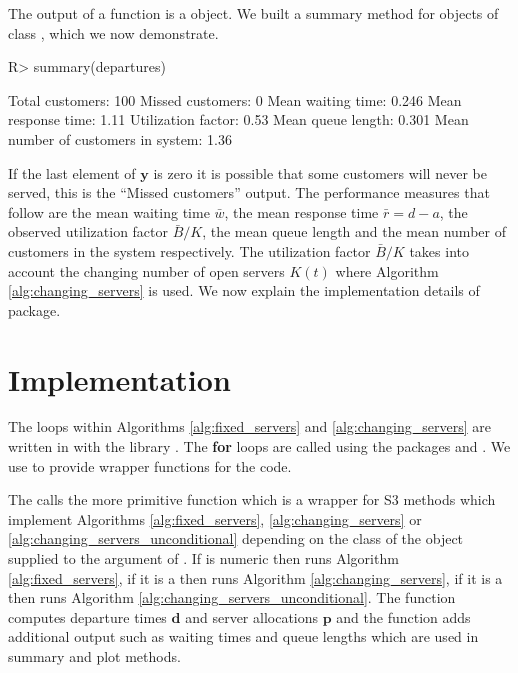 \documentclass[article]{jss}
\begin{document}
The output of a  function is a  object. We built a summary method for objects of class , which we now demonstrate. 

\begin{CodeChunk}
\begin{Sinput}
R> summary(departures)
\end{Sinput}
\begin{Soutput}
Total customers:
 100
Missed customers:
 0
Mean waiting time:
 0.246
Mean response time:
 1.11
Utilization factor:
 0.53
Mean queue length:
 0.301
Mean number of customers in system:
 1.36
\end{Soutput}
\end{CodeChunk}

If the last element of $\mathbf{y}$ is zero it is possible that some customers will never be served, this is the ``Missed customers'' output. The performance measures that follow are the mean waiting time $\bar{w}$, the mean response time $\bar{r} = d - a$, the observed utilization factor $\bar{B}/K$, the mean queue length and the mean number of customers in the system respectively. The utilization factor $\bar{B}/K$ takes into account the changing number of open servers $K(t)$ where Algorithm \ref{alg:changing_servers} is used. We now explain the implementation details of package.  


\section{Implementation} \label{sec:Implementation}

The  loops within Algorithms \ref{alg:fixed_servers} and \ref{alg:changing_servers} are written in  with the  library \citep{sanderson2016armadillo}. The  \textbf{for} loops are called using the  packages  \citep{eddelbuettel2011rcpp} and  \citep{eddelbuettel2014rcpparmadillo}. We use  to provide wrapper functions for the  code. 

The  calls the more primitive  function which is a wrapper for S3 methods which implement Algorithms \ref{alg:fixed_servers}, \ref{alg:changing_servers} or \ref{alg:changing_servers_unconditional} depending on the class of the object supplied to the  argument of . If  is numeric then  runs Algorithm \ref{alg:fixed_servers}, if it is a  then  runs Algorithm \ref{alg:changing_servers}, if it is a  then  runs Algorithm \ref{alg:changing_servers_unconditional}. The  function computes departure times $\mathbf{d}$ and server allocations $\mathbf{p}$ and the  function adds additional output such as waiting times and queue lengths which are used in summary and plot methods.  
\end{document}
